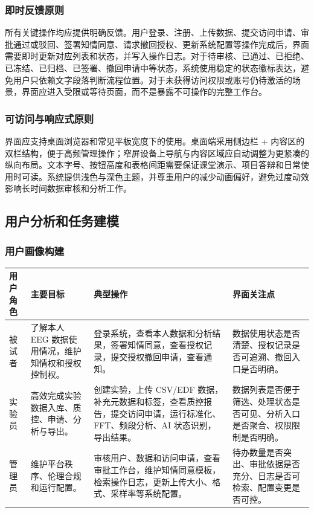 \subsubsection{即时反馈原则}

所有关键操作均应提供明确反馈。用户登录、注册、上传数据、提交访问申请、审批通过或驳回、签署知情同意、请求撤回授权、更新系统配置等操作完成后，界面需要即时更新对应列表和状态，并写入操作日志。对于待审核、已通过、已拒绝、已冻结、已归档、已签署、撤回申请中等状态，系统使用稳定的状态徽标表达，避免用户只依赖文字段落判断流程位置。对于未获得访问权限或账号仍待激活的场景，界面应进入受限或等待页面，而不是暴露不可操作的完整工作台。

\subsubsection{可访问与响应式原则}

界面应支持桌面浏览器和常见平板宽度下的使用。桌面端采用侧边栏 + 内容区的双栏结构，便于高频管理操作；窄屏设备上导航与内容区域应自动调整为更紧凑的纵向布局。文本字号、按钮高度和表格间距需要保证课堂演示、项目答辩和日常使用时可读。系统提供浅色与深色主题，并尊重用户的减少动画偏好，避免过度动效影响长时间数据审核和分析工作。

\subsection{用户分析和任务建模}

\subsubsection{用户画像构建}

\begin{longtable}{|p{23mm}|p{34mm}|p{48mm}|p{30mm}|}
\hline
\textbf{用户角色} & \textbf{主要目标} & \textbf{典型操作} & \textbf{界面关注点} \\
\hline
被试者 & 了解本人 EEG 数据使用情况，维护知情权和授权控制权。 & 登录系统，查看本人数据和分析结果，签署知情同意，查看授权记录，提交授权撤回申请，查看通知。 & 数据使用状态是否清楚、授权记录是否可追溯、撤回入口是否明确。 \\
\hline
实验员 & 高效完成实验数据入库、质控、申请、分析与导出。 & 创建实验，上传 CSV/EDF 数据，补充元数据和标签，查看质控报告，提交访问申请，运行标准化、FFT、频段分析、AI 状态识别，导出结果。 & 数据列表是否便于筛选、处理状态是否可见、分析入口是否聚合、权限限制是否明确。 \\
\hline
管理员 & 维护平台秩序、伦理合规和运行配置。 & 审核用户、数据和访问申请，查看审批工作台，维护知情同意模板，检索操作日志，更新上传大小、格式、采样率等系统配置。 & 待办数量是否突出、审批依据是否充分、日志是否可检索、配置变更是否可控。 \\
\hline
\end{longtable}

